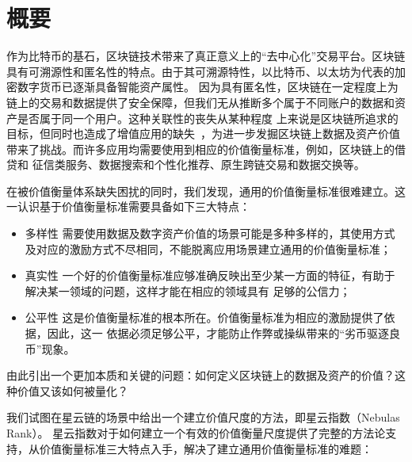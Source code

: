 \section{概要}
作为比特币的基石，区块链技术带来了真正意义上的“去中心化”交易平台。区块链具有可溯源性和匿名性的特点。由于其可溯源特性，以比特币、以太坊为代表的加密数字货币已逐渐具备智能资产属性。
因为具有匿名性，区块链在一定程度上为链上的交易和数据提供了安全保障，但我们无从推断多个属于不同账户的数据和资产是否属于同一个用户。这种关联性的丧失从某种程度
上来说是区块链所追求的目标，但同时也造成了增值应用的缺失~\cite{meiklejohn2013fistful}，为进一步发掘区块链上数据及资产价值带来了挑战。而许多应用均需要使用到相应的价值衡量标准，例如，区块链上的借贷和
征信类服务、数据搜索和个性化推荐、原生跨链交易和数据交换等。



在被价值衡量体系缺失困扰的同时，我们发现，通用的价值衡量标准很难建立。这一认识基于价值衡量标准需要具备如下三大特点：

\begin{itemize}
\item{多样性} 需要使用数据及数字资产价值的场景可能是多种多样的，其使用方式及对应的激励方式不尽相同，不能脱离应用场景建立通用的价值衡量标准；
\item{真实性} 一个好的价值衡量标准应够准确反映出至少某一方面的特征，有助于解决某一领域的问题，这样才能在相应的领域具有
足够的公信力；
\item{公平性} 这是价值衡量标准的根本所在。价值衡量标准为相应的激励提供了依据，因此，这一
依据必须足够公平，才能防止作弊或操纵带来的“劣币驱逐良币”现象。
\end{itemize}

由此引出一个更加本质和关键的问题：如何定义区块链上的数据及资产的价值？这种价值又该如何被量化？


我们试图在星云链的场景中给出一个建立价值尺度的方法，即星云指数（Nebulas Rank）。
星云指数对于如何建立一个有效的价值衡量尺度提供了完整的方法论支持，从价值衡量标准三大特点入手，解决了建立通用价值衡量标准的难题：

